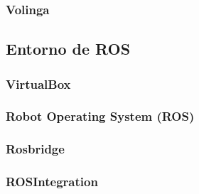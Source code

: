 \documentclass[a4paper, 12pt, spanish, twoside]{article}
\begin{document}
\subsubsection{Volinga} \label{sec:herramientas:motoresgraficos3d:volinga}



\subsection{Entorno de ROS} \label{sec:herramientas:entornoros}

\subsubsection{VirtualBox} \label{sec:herramientas:entornoros:virtualbox}


\subsubsection{Robot Operating System (ROS)} \label{sec:herramientas:entornoros:ros}


\subsubsection{Rosbridge} \label{sec:herramientas:entornoros:rosbridge}


\subsubsection{ROSIntegration} \label{sec:herramientas:entornoros:rosintegration}


\clearpage
\end{document}
